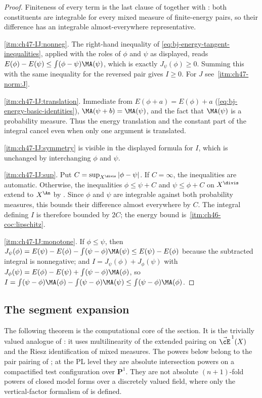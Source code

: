 \begin{proof}
Finiteness of every term is the last clause of 
together with : both constituents are integrable
for every mixed measure of finite-energy pairs, so their difference has
an integrable almost-everywhere representative.

\cref{itm:ch47-IJ:nonneg}.  The right-hand inequality of
\eqref{eq:bj-energy-tangent-inequalities}, applied with the roles of
$\phi$ and $\psi$ as displayed, reads
$E(\phi)-E(\psi)\le\int(\phi-\psi)\MA(\psi)$, which is exactly
$J_\psi(\phi)\ge0$.  Summing this with the same inequality for the
reversed pair gives $I\ge0$.  For $J$ see
\,\cref{itm:ch47-norm:J}.

\cref{itm:ch47-IJ:translation}.  Immediate from
$E(\phi+a)=E(\phi)+a$ (\eqref{eq:bj-energy-basic-identities}),
$\MA(\psi+b)=\MA(\psi)$, and the fact that $\MA(\psi)$ is a probability
measure.  Thus the energy translation and the constant part of the
integral cancel even when only one argument is translated.

\cref{itm:ch47-IJ:symmetry} is visible in the displayed formula for $I$,
which is unchanged by interchanging $\phi$ and $\psi$.

\cref{itm:ch47-IJ:sup}.  Put
$C=\sup_{X^{\divis}}|\phi-\psi|$.  If $C=\infty$, the inequalities are
automatic.  Otherwise, the inequalities $\phi\leq\psi+C$ and
$\psi\leq\phi+C$ on $X^{\divis}$ extend to $X^{\An}$ by
.  Since $\phi$ and $\psi$ are
integrable against both probability measures, this bounds their
difference almost everywhere by $C$.  The integral defining $I$ is
therefore bounded by $2C$; the energy bound is
\,\cref{itm:ch46-coc:lipschitz}.

\cref{itm:ch47-IJ:monotone}.  If $\phi\le\psi$, then
$J_\psi(\phi)=E(\psi)-E(\phi)-\int(\psi-\phi)\MA(\psi)\le E(\psi)-E(\phi)$
because the subtracted integral is nonnegative; and
$I=J_\psi(\phi)+J_\phi(\psi)$ with
$J_\phi(\psi)=E(\phi)-E(\psi)+\int(\psi-\phi)\MA(\phi)$, so
$I=\int(\psi-\phi)\MA(\phi)-\int(\psi-\phi)\MA(\psi)
\le\int(\psi-\phi)\MA(\phi)$.
\end{proof}

\subsection{The segment expansion}
\label{sec:ch47-segment}

The following theorem is the computational core of the section.  It is the
trivially valued analogue of : it uses
multilinearity of the extended pairing on $\vec\cE^{\,1}(X)$ and the
Riesz identification of mixed measures.  The powers below belong to the
pair pairing of ; at the PL level they are absolute
intersection powers on a compactified test configuration over
$\mathbf P^1$.  They are not absolute $(n+1)$-fold powers of closed
model forms over a discretely valued field, where only the vertical-factor
formalism of  is defined.

